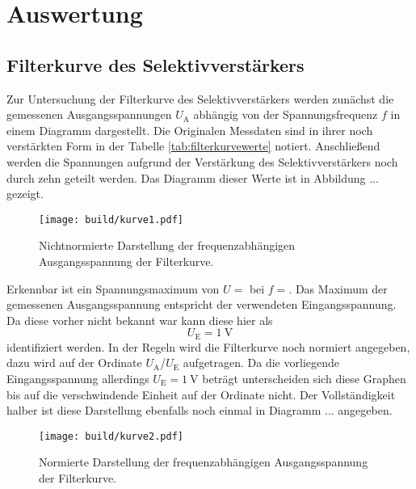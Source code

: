\section{Auswertung}

\subsection{Filterkurve des Selektivverstärkers}

Zur Untersuchung der Filterkurve des Selektivverstärkers werden zunächst die gemessenen Ausgangsspannungen $U_{\text{A}}$ abhängig von der Spannungsfrequenz $f$ in einem Diagramm dargestellt.  Die Originalen Messdaten sind in ihrer noch verstärkten Form in der Tabelle \ref{tab:filterkurvewerte} notiert.
Anschließend werden die Spannungen aufgrund der Verstärkung des Selektivverstärkers noch durch zehn geteilt werden.
Das Diagramm dieser Werte ist in Abbildung ... gezeigt.

\begin{figure}
    \centering
    \texttt{[image: build/kurve1.pdf]}
    \caption{Nichtnormierte Darstellung der frequenzabhängigen Ausgangsspannung der Filterkurve.} 
    \label{fig:kurve1}
\end{figure}

Erkennbar ist ein Spannungsmaximum von $U= $ bei $f = $. Das Maximum der gemessenen Ausgangsspannung entspricht der verwendeten Eingangsspannung. Da diese vorher nicht bekannt war kann diese hier als 
\begin{equation*}
U_{\text{E}} = \SI{1}{\volt}
\end{equation*}
identifiziert werden. In der Regeln wird die Filterkurve noch normiert angegeben, dazu wird auf der Ordinate $U_{\text{A}}$/$U_{\text{E}}$ aufgetragen. Da die vorliegende Eingangsspannung allerdings $U_{\text{E}} = \SI{1}{\volt}$ beträgt 
unterscheiden sich diese Graphen bis auf die verschwindende Einheit auf der Ordinate nicht. Der Vollständigkeit halber ist diese Darstellung ebenfalls noch einmal in Diagramm ... angegeben.

\begin{figure}
    \centering
    \texttt{[image: build/kurve2.pdf]}
    \caption{Normierte Darstellung der frequenzabhängigen Ausgangsspannung der Filterkurve.} 
    \label{fig:kurve2}
\end{figure}


